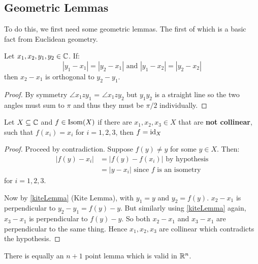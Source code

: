 \documentclass[../main.tex]{subfiles}
\begin{document}
\subsection{Geometric Lemmas}
To do this, we first need some geometric lemmas.
The first of which is a basic fact from Euclidean geometry.
\begin{lemma}
  Let $x_1, x_2, y_1, y_2 \in \mathbb{C}$. If:
  \[
    |y_1 - x_1| = |y_2 - x_1| \text{ and } |y_1 - x_2| = |y_2 - x_2|
    \label{kiteLemma}
  \]
  then $x_2 - x_1$ is orthogonal to $y_2 - y_1$.
\end{lemma}
\begin{center}
\end{center}
\begin{proof}
  By symmetry $\angle x_1 z y_1$ = $\angle x_1 z y_2$ but $y_1 y_2$ is a straight line so the two angles must sum to $\pi$ and thus they must be $\pi/2$ individually.
\end{proof}
\begin{lemma}
  Let $X \subseteq \mathbb{C}$ and $f \in \operatorname{Isom}(X)$ if there are $x_1, x_2, x_3 \in X$ that are \textbf{not collinear}, such that $f(x_i) = x_i$ for $i = 1, 2, 3$, then $f = \mathrm{id}_X$
  \label{threePoint}
\end{lemma}
\begin{proof}
  Proceed by contradiction.
  Suppose $f(y) \neq y$ for some $y \in X$.
  Then:
  \begin{align*}
    |f(y) - x_i| &= |f(y) - f(x_i)| \text{ by hypothesis} \\
                 &= |y - x_i| \text{ since $f$ is an isometry}
  \end{align*}
  for $i =1, 2, 3$.

  Now by \cref{kiteLemma} (Kite Lemma), with $y_1 = y$ and $y_2 = f(y)$. $x_2 - x_1$ is perpendicular to $y_2 - y_1 = f(y) - y$.
  But similarly using \cref{kiteLemma} again, $x_3 - x_1$ is perpendicular to $f(y) - y$.
  So both $x_2 - x_1$ and $x_3 - x_1$ are perpendicular to the same thing.
  Hence $x_1, x_2, x_3$ are collinear which contradicts the hypothesis.
\end{proof}
\begin{remark}
  There is equally an $n + 1$ point lemma which is valid in $\mathbb{R}^{n}$.
\end{remark}
\end{document}
